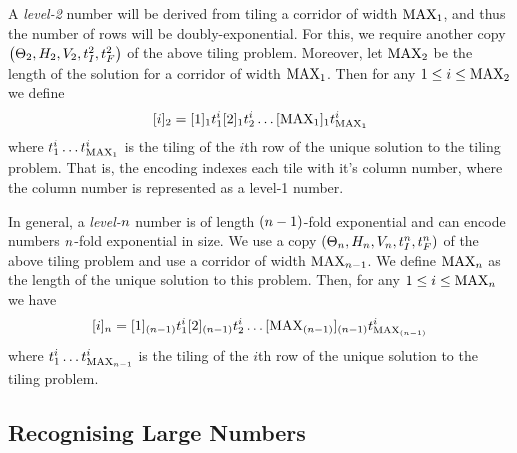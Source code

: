 A \emph{level-2} number will be derived from tiling a corridor of width $\nmax{1}$, and thus the number of rows will be doubly-exponential.
For this, we require another copy
$\tup{\tilesnum{2}, \hrelnum{2}, \vrelnum{2}, \inittilenum{2}, \fintilenum{2}}$
of the above tiling problem.
Moreover, let $\nmax{2}$ be the length of the solution for a corridor of width $\nmax{1}$.
Then for any
$1 \leq i \leq \nmax{2}$
we define
\[
    \tenc{2}{i} =
        \tenc{1}{1} \tile^i_1
        \tenc{1}{2} \tile^i_2
        \ldots
        \tenc{1}{\nmax{1}} \tile^i_{\nmax{1}}
\]
where
$\tile^i_1 \ldots \tile^i_{\nmax{1}}$
is the tiling of the $i$th row of the unique solution to the tiling problem.
That is, the encoding indexes each tile with it's column number, where the column number is represented as a level-1 number.

In general, a \emph{level-$\expheight$} number is of length $(\expheight-1)$-fold exponential and can encode numbers $\expheight$-fold exponential in size.
We use a copy
$\tup{\tilesnum{\expheight},
      \hrelnum{\expheight},
      \vrelnum{\expheight},
      \inittilenum{\expheight},
      \fintilenum{\expheight}}$
of the above tiling problem and use a corridor of width
$\nmax{\expheight-1}$.
We define $\nmax{\expheight}$ as the length of the unique solution to this problem.
Then, for any $1 \leq i \leq \nmax{\expheight}$ we have
\[
    \tenc{\expheight}{i} =
        \tenc{(\expheight-1)}{1} \tile^i_1
        \tenc{(\expheight-1)}{2} \tile^i_2
        \ldots
        \tenc{(\expheight-1)}{\nmax{(\expheight-1)}} \tile^i_{\nmax{(\expheight-1)}}
\]
where
$\tile^i_1 \ldots \tile^i_{\nmax{\expheight-1}}$
is the tiling of the $i$th row of the unique solution to the tiling problem.

\subsection{Recognising Large Numbers}

